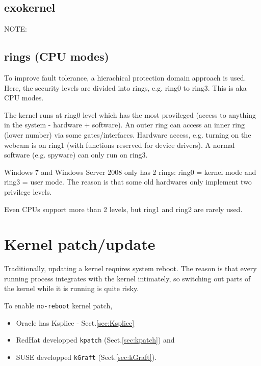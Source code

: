 \subsection{exokernel}
\label{sec:exokernel}


NOTE:


\subsection{rings (CPU modes)}

To improve fault tolerance, a hierachical protection domain approach is used.
Here, the security levels are divided into rings, e.g. ring0 to ring3. This is
aka CPU modes.

The kernel runs at ring0 level which has the most provileged (access to anything
in the system - hardware + software). An outer ring can access an inner ring
(lower number) via some gates/interfaces. Hardware access, e.g. turning on the
webcam is on ring1 (with functions reserved for device drivers). A normal
software (e.g. spyware) can only run on ring3.

Windows 7 and Windows Server 2008 only has 2 rings: ring0 = kernel mode and
ring3 = user mode. The reason is that some old hardwares only implement two
privilege levels.

Even CPUs support more than 2 levels, but ring1 and ring2 are rarely used.

\section{Kernel patch/update}
\label{sec:kernel-update}

Traditionally, updating a kernel requires system reboot.
The reason is that every running process integrates with the kernel intimately,
so switching out parts of the kernel while it is running is quite risky.

To enable \verb!no-reboot! kernel patch,
\begin{itemize}
  
  \item Oracle has Ksplice - Sect.\ref{sec:Ksplice}
  
  \item RedHat developped \verb!kpatch! (Sect.\ref{sec:kpatch}) and 
  
   \item SUSE developped \verb!kGraft! (Sect.\ref{sec:kGraft}). 
\end{itemize} 

